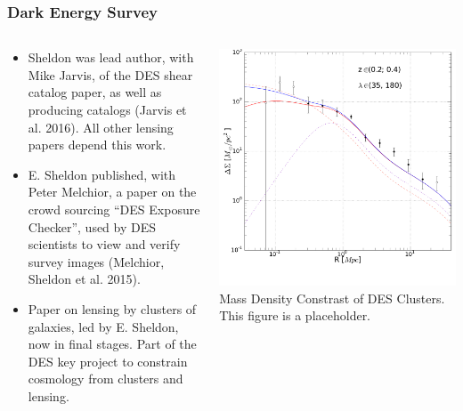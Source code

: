 \documentclass{beamer}
\begin{document}
\frame
{

    \frametitle{Dark Energy Survey}

    \fontsize{9}{0.8\baselineskip}

    \begin{columns}

        \begin{column}{0.5\textwidth}

            \begin{itemize}

                \item Sheldon was lead author, with Mike Jarvis, of the DES shear catalog
                    paper, as well as producing catalogs (Jarvis et al. 2016).  All
                    other lensing papers depend this work.

                \item E. Sheldon published, with Peter Melchior, a paper on the crowd
                    sourcing ``DES Exposure Checker'', used by DES scientists
                    to view and verify survey images (Melchior, Sheldon et al. 2015).

                \item Paper on lensing by clusters of galaxies, led by E. Sheldon,
                    now in final stages.  Part of the DES key project to constrain
                    cosmology from clusters and lensing.

            \end{itemize}

        \end{column}

        \begin{column}{0.5\textwidth}
            \includegraphics[scale=0.17]{delta_sigma_best_fit_z0_l4.pdf}
            \newline
            {\tiny Mass Density Constrast of DES Clusters. This figure is a placeholder.}
        \end{column}

    \end{columns}

}
\end{document}
